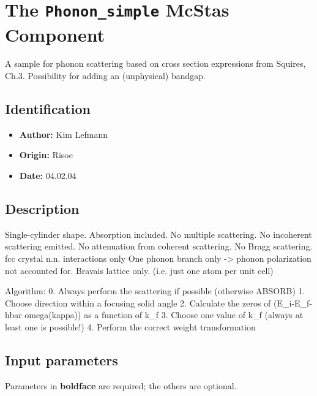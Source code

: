 \section{The \texttt{Phonon\_simple} McStas Component}
A sample for phonon scattering based on cross section expressions from Squires, Ch.3.
Possibility for adding an (unphysical) bandgap.

\subsection*{Identification}
\begin{itemize}
  \item \textbf{Author:} Kim Lefmann
  \item \textbf{Origin:} Risoe
  \item \textbf{Date:} 04.02.04
\end{itemize}

\subsection*{Description}
Single-cylinder shape. Absorption included. No multiple scattering. No incoherent scattering emitted. No attenuation from coherent scattering. No Bragg scattering. fcc crystal n.n. interactions only One phonon branch only -\textgreater{} phonon polarization not accounted for. Bravais lattice only. (i.e. just one atom per unit cell)

Algorithm: 0. Always perform the scattering if possible (otherwise ABSORB) 1. Choose direction within a focusing solid angle 2. Calculate the zeros of (E\_i-E\_f-hbar omega(kappa)) as a function of k\_f 3. Choose one value of k\_f (always at least one is possible!) 4. Perform the correct weight transformation

\subsection*{Input parameters}
Parameters in \textbf{boldface} are required; the others are optional.

